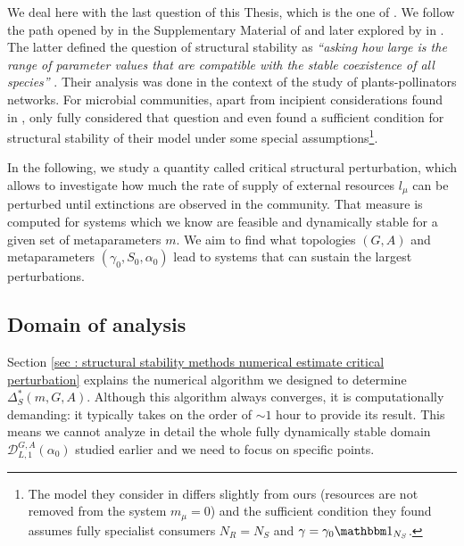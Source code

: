 \documentclass[12pt, titlepage]{report}
\begin{document}
We deal here with the last question of this Thesis, which is the one of . We follow the path opened by \citeauthor{bastolla_architecture_2009} in the Supplementary Material of \cite{bastolla_architecture_2009} and later explored by  \citeauthor{rohr_structural_2014} in \cite{rohr_structural_2014}. The latter defined the question of structural stability as \textit{``asking how large is the range of parameter values that are compatible with the stable coexistence of all species''} \cite{rohr_structural_2014}. Their analysis was done in the context of the study of plants-pollinators networks.
For microbial communities, apart from incipient considerations found in  \cite{tikhonov_collective_2017,marsland_available_2019}, only \citeauthor{butler_stability_2018} fully considered that question \cite{butler_stability_2018} and even found a sufficient condition for structural stability of their model under some special assumptions\footnote{The model they consider in \cite{butler_stability_2018} differs slightly from ours (\eg resources are not removed from the system $m_\mu=0$) and the sufficient condition they found assumes fully specialist consumers \ie $N_R=N_S$ and $\gamma=\gamma_0 \identity{N_S}$.}.

In the following, we study a quantity called critical structural perturbation, which allows to investigate how much the rate of supply of external resources $l_\mu$ can be perturbed until extinctions are observed in the community. That measure is computed for systems which we know are feasible and dynamically stable for a given set of metaparameters $m$.
We aim to find what topologies $(G,A)$ and metaparameters $(\gamma_0, S_0, \alpha_0)$ lead to systems that can sustain the largest perturbations.
\subsection{Domain of analysis}
Section \ref{sec : structural stability methods numerical estimate critical perturbation} explains the numerical algorithm we designed to determine $\Delta_S^*(m, G, A)$. Although this algorithm always converges, it is computationally demanding: it typically takes on the order of $\sim 1$ hour to provide its result. This means we cannot analyze in detail the whole fully dynamically stable domain $\mathcal{D}_{L,1}^{G,A}(\alpha_0)$ studied earlier and we need to focus on specific points.
\end{document}
